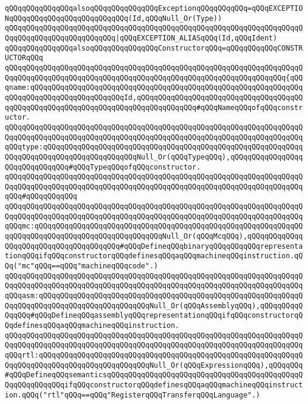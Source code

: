 \newline
\verb|qQQqqQQqqQQqqQQqalsoqQQqqQQqqQQqqQQqExceptionqQQqqQQqqQQq=qQQqEXCEPTIONqQQqqQQqqQQqqQQqqQQqqQQqqQQq(Id,qQQqNull_Or(Type))|\newline
\verb|qQQqqQQqqQQqqQQqqQQqqQQqqQQqqQQqqQQqqQQqqQQqqQQqqQQqqQQqqQQqqQQqqQQqqQQqqQQqqQQqqQQqqQQqqQQqqQQq|\verb#|qQQqEXCEPTION_ALIASqQQq(Id,qQQqIdent)#\newline
\newline
\verb|qQQqqQQqqQQqqQQqalsoqQQqqQQqqQQqqQQqConstructorqQQq=qQQqqQQqqQQqCONSTRUCTORqQQq|\newline
\verb|qQQqqQQqqQQqqQQqqQQqqQQqqQQqqQQqqQQqqQQqqQQqqQQqqQQqqQQqqQQqqQQqqQQqqQQqqQQqqQQqqQQqqQQqqQQqqQQqqQQqqQQqqQQqqQQqqQQqqQQqqQQqqQQqqQQqqQQq{qQQqname:qQQqqQQqqQQqqQQqqQQqqQQqqQQqqQQqqQQqqQQqqQQqqQQqqQQqqQQqqQQqqQQqqQQqqQQqqQQqqQQqqQQqqQQqqQQqId,qQQqqQQqqQQqqQQqqQQqqQQqqQQqqQQqqQQqqQQqqQQqqQQqqQQqqQQqqQQqqQQqqQQqqQQqqQQqqQQqqQQq#qQQqNameqQQqofqQQqconstructor.|\newline
\verb|qQQqqQQqqQQqqQQqqQQqqQQqqQQqqQQqqQQqqQQqqQQqqQQqqQQqqQQqqQQqqQQqqQQqqQQqqQQqqQQqqQQqqQQqqQQqqQQqqQQqqQQqqQQqqQQqqQQqqQQqqQQqqQQqqQQqqQQqqQQqqQQqtype:qQQqqQQqqQQqqQQqqQQqqQQqqQQqqQQqqQQqqQQqqQQqqQQqqQQqqQQqqQQqqQQqqQQqqQQqqQQqqQQqqQQqqQQqqQQqNull_Or(qQQqTypeqQQq),qQQqqQQqqQQqqQQqqQQqqQQqqQQqqQQq#qQQqTypeqQQqofqQQqconstructor.|\newline
\verb|qQQqqQQqqQQqqQQqqQQqqQQqqQQqqQQqqQQqqQQqqQQqqQQqqQQqqQQqqQQqqQQqqQQqqQQqqQQqqQQqqQQqqQQqqQQqqQQqqQQqqQQqqQQqqQQqqQQqqQQqqQQqqQQqqQQqqQQqqQQqqQQq#qQQqqQQqqQQq|\newline
\verb|qQQqqQQqqQQqqQQqqQQqqQQqqQQqqQQqqQQqqQQqqQQqqQQqqQQqqQQqqQQqqQQqqQQqqQQqqQQqqQQqqQQqqQQqqQQqqQQqqQQqqQQqqQQqqQQqqQQqqQQqqQQqqQQqqQQqqQQqqQQqqQQqmc:qQQqqQQqqQQqqQQqqQQqqQQqqQQqqQQqqQQqqQQqqQQqqQQqqQQqqQQqqQQqqQQqqQQqqQQqqQQqqQQqqQQqqQQqqQQqqQQqqQQqNull_Or(qQQqMcqQQq),qQQqqQQqqQQqqQQqqQQqqQQqqQQqqQQqqQQqqQQq#qQQqDefineqQQqbinaryqQQqqQQqqQQqrepresentationqQQqifqQQqconstructorqQQqdefinesqQQqaqQQqmachineqQQqinstruction.qQQq("mc"qQQq==qQQq"machineqQQqcode".)|\newline
\verb|qQQqqQQqqQQqqQQqqQQqqQQqqQQqqQQqqQQqqQQqqQQqqQQqqQQqqQQqqQQqqQQqqQQqqQQqqQQqqQQqqQQqqQQqqQQqqQQqqQQqqQQqqQQqqQQqqQQqqQQqqQQqqQQqqQQqqQQqqQQqqQQqasm:qQQqqQQqqQQqqQQqqQQqqQQqqQQqqQQqqQQqqQQqqQQqqQQqqQQqqQQqqQQqqQQqqQQqqQQqqQQqqQQqqQQqqQQqqQQqqQQqNull_Or(qQQqAssemblyqQQq),qQQqqQQqqQQqqQQq#qQQqDefineqQQqassemblyqQQqrepresentationqQQqifqQQqconstructorqQQqdefinesqQQqaqQQqmachineqQQqinstruction.|\newline
\verb|qQQqqQQqqQQqqQQqqQQqqQQqqQQqqQQqqQQqqQQqqQQqqQQqqQQqqQQqqQQqqQQqqQQqqQQqqQQqqQQqqQQqqQQqqQQqqQQqqQQqqQQqqQQqqQQqqQQqqQQqqQQqqQQqqQQqqQQqqQQqqQQqrtl:qQQqqQQqqQQqqQQqqQQqqQQqqQQqqQQqqQQqqQQqqQQqqQQqqQQqqQQqqQQqqQQqqQQqqQQqqQQqqQQqqQQqqQQqqQQqqQQqNull_Or(qQQqExpressionqQQq),qQQqqQQq#qQQqDefineqQQqsemanticsqQQqqQQqqQQqqQQqqQQqqQQqqQQqqQQqqQQqqQQqqQQqqQQqqQQqqQQqqQQqifqQQqconstructorqQQqdefinesqQQqaqQQqmachineqQQqinstruction.qQQq("rtl"qQQq==qQQq"RegisterqQQqTransferqQQqLanguage".)|\newline
